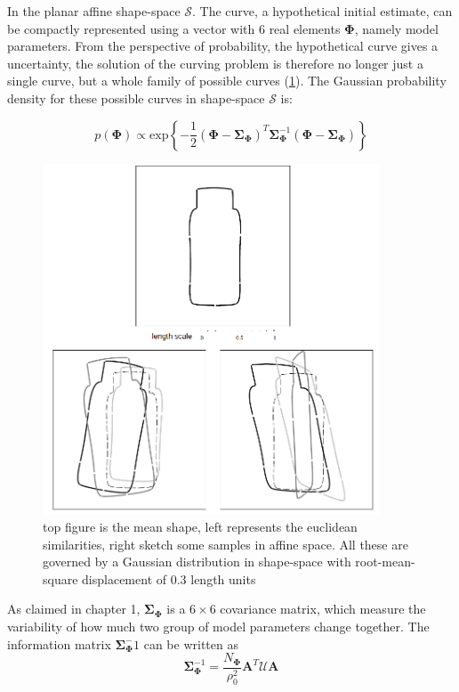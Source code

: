 In the planar affine shape-space $\mathcal{S}$. The curve, a
hypothetical initial estimate, can be compactly represented using a
vector with 6 real elements $\mathbf{\Phi}$, namely model
parameters. From the perspective of probability, the hypothetical
curve gives a uncertainty, the solution of the curving problem is
therefore no longer just a single curve, but a whole family of
possible curves (\ref{fig:prior}). The Gaussian probability density for these possible
curves in shape-space $\mathcal{S}$ is:

\begin{equation}
  \label{eq:5.1}
   p(\mathbf{\Phi}) \propto
\mathrm{exp} \left\{ -\frac{1}{2} (\mathbf{\Phi} -
  \mathbf{\Sigma}_{\mathbf{\Phi}})^T \mathbf{\Sigma}_{\mathbf{\Phi}}^{-1} (\mathbf{\Phi} -
  \mathbf{\Sigma}_{\mathbf{\Phi}}) \right\}
\end{equation}

\begin{figure}[htb]
  \centering
  \includegraphics[width=10cm]{images/prior.png}
\caption[Sampling from curve families\cite{blake1998active}]{top
  figure is the mean shape, left represents the euclidean similarities, right
  sketch some samples in affine space. All these are governed by a
  Gaussian distribution in shape-space with root-mean-square
  displacement of 0.3 length units}
\label{fig:prior}
\end{figure}

As claimed in chapter 1, $\mathbf{\Sigma}_{\mathbf{\Phi}}$ is a $6 \times 6$ 
covariance matrix, which measure the variability of
how much two group of model parameters change together. The
information matrix $\mathbf{\Sigma}_{\mathbf{\Phi}}^-1$ can be
written as 
\begin{equation}
  \label{eq:5.2}
  \mathbf{\Sigma}_{\mathbf{\Phi}}^{-1} = \frac{N_{\mathbf{\Phi}}}{\rho_0^2} \mathbf{A}^T\mathcal{U}\mathbf{A}
\end{equation}

